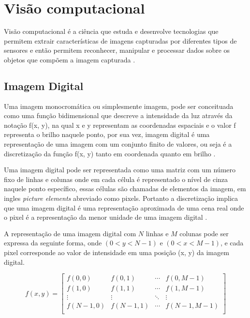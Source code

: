 \section[Visão computacional]{Visão computacional}
Visão computacional é a ciência que estuda e desenvolve tecnologias que permitem extrair características de imagens capturadas por diferentes tipos de sensores e então permitem reconhecer, manipular e processar dados sobre os objetos que compõem a imagem capturada \cite{VisaoComp}.

\subsection[Imagem Digital]{Imagem Digital}

Uma imagem monocromática ou simplesmente imagem,  pode ser conceituada como uma função bidimensional que descreve a intensidade da luz através da notação f(x, y), na qual x e y representam as coordenadas espaciais e o valor f representa  o brilho naquele ponto, por sua vez, imagem digital é uma representação de uma imagem com um conjunto finito de valores, ou seja é a discretização da função f(x, y) tanto em coordenada quanto em brilho \cite{imagemMonocromatica}.

Uma imagem digital pode ser representada como uma matriz com um número fixo de linhas e colunas onde em cada célula é representado o nível de cinza naquele ponto específico, essas células são chamadas de elementos da imagem, em ingles \textit{picture elements} abreviado como pixels. Portanto a discretização implica que uma imagem digital é uma representação aproximada de uma cena real onde o pixel é a representação da menor unidade de uma imagem digital \cite{imagemMonocromatica}. 

A representação de uma imagem digital com $N$ linhas e $M$ colunas pode ser expressa da seguinte forma, onde $(0 < y < N-1)$ e $(0 < x < M-1)$, e cada pixel corresponde ao valor de intensidade em uma posição (x, y) da imagem digital.

\[
    f(x,y) = \left[
        \begin{array}{cccc}
        f(0,0) & f(0,1) & \cdots & f(0,M-1) \\
        f(1,0) & f(1,1) & \cdots & f(1,M-1) \\
        \vdots & \vdots & \ddots & \vdots \\
        f(N-1,0) & f(N-1,1) & \cdots & f(N-1,M-1) \\
        \end{array}
    \right]
\]


